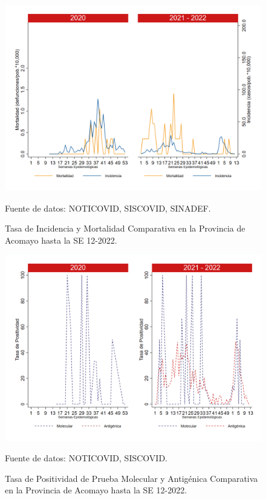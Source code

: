 \documentclass[12pt,a4paper,openany]{book}
\begin{document}
		\begin{figure}[h]
			\caption{Tasa de Incidencia y Mortalidad Comparativa en la Provincia de Acomayo hasta la SE 12-2022.}\label{fig:inc_mort_acomayo}
			\begin{center}
				\includegraphics[width=0.70\linewidth]{../figuras/incidencia_mortalidad_20_21_1.png}
			\end{center}
			{\footnotesize {Fuente de datos: NOTICOVID, SISCOVID, SINADEF.}}
		\end{figure}
		
		\begin{figure}[h]
			\caption{Tasa de Positividad de Prueba Molecular y Antigénica Comparativa en la Provincia de Acomayo hasta la SE 12-2022. }\label{fig:positividad_acomayo}
			\begin{center}
				\includegraphics[width=0.7\linewidth]{../figuras/positividad_20_21_1.png}
			\end{center}
			{\footnotesize {Fuente de datos: NOTICOVID, SISCOVID.}}
		\end{figure}
		
\end{document}
